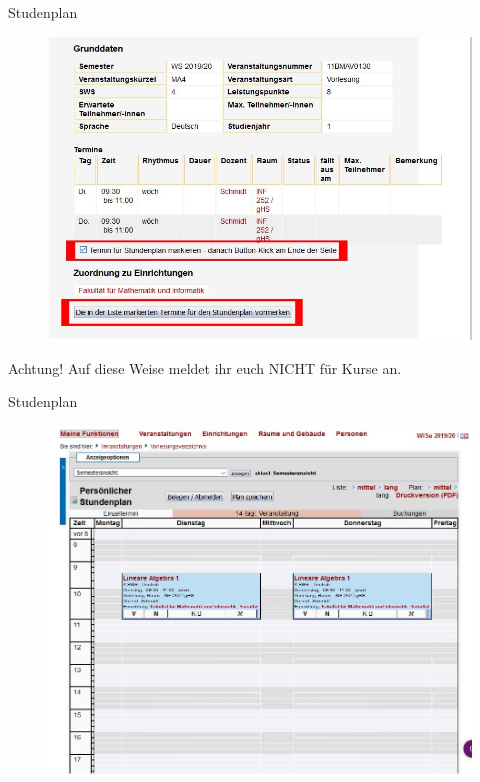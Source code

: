 \begin{frame}{Studenplan}
  \begin{figure}
     \centering
     \includegraphics[scale=0.3]{images/lsf14.jpg}
  \end{figure}
Achtung! Auf diese Weise meldet ihr euch NICHT für Kurse an.
\end{frame}

\begin{frame}{Studenplan}
  \begin{figure}
     \centering
     \includegraphics[scale=0.25]{images/lsf15.jpg}
  \end{figure}
\end{frame}

